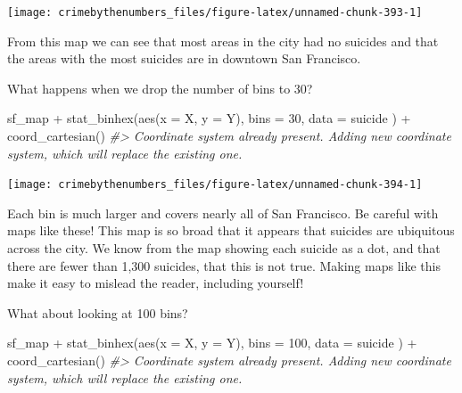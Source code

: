 \documentclass[
]{krantz}
\makeatletter
\newenvironment{Shaded}{\begin{snugshade}}{\end{snugshade}}
\newcommand{\AttributeTok}[1]{\textcolor[rgb]{0.61,0.61,0.61}{#1}}
\newcommand{\CommentTok}[1]{\textcolor[rgb]{0.37,0.37,0.37}{\textit{#1}}}
\newcommand{\DecValTok}[1]{\textcolor[rgb]{0.06,0.06,0.06}{#1}}
\newcommand{\FunctionTok}[1]{\textcolor[rgb]{0,0,0}{#1}}
\newcommand{\NormalTok}[1]{#1}
\newcommand{\SpecialCharTok}[1]{\textcolor[rgb]{0,0,0}{#1}}
\newenvironment{kframe}{%
\medskip{}
\setlength{\fboxsep}{.8em}
 \def\at@end@of@kframe{}%
 \ifinner\ifhmode%
  \def\at@end@of@kframe{\end{minipage}}%
  \begin{minipage}{\columnwidth}%
 \fi\fi%
 \def\FrameCommand##1{\hskip\@totalleftmargin \hskip-\fboxsep
 \colorbox{shadecolor}{##1}\hskip-\fboxsep
     \hskip-\linewidth \hskip-\@totalleftmargin \hskip\columnwidth}%
 \MakeFramed {\advance\hsize-\width
   \@totalleftmargin\z@ \linewidth\hsize
   \@setminipage}}%
 {\par\unskip\endMakeFramed%
 \at@end@of@kframe}
\renewenvironment{Shaded}{\begin{kframe}}{\end{kframe}}
\makeatother
\begin{document}
\begin{center}\texttt{[image: crimebythenumbers\_files/figure-latex/unnamed-chunk-393-1]} \end{center}

From this map we can see that most areas in the city had no
suicides and that the areas with the most suicides are in
downtown San Francisco.

What happens when we drop the number of bins to 30?

\begin{Shaded}
\begin{Highlighting}[]
\NormalTok{sf\_map }\SpecialCharTok{+}
  \FunctionTok{stat\_binhex}\NormalTok{(}\FunctionTok{aes}\NormalTok{(}\AttributeTok{x =}\NormalTok{ X, }\AttributeTok{y =}\NormalTok{ Y),}
    \AttributeTok{bins =} \DecValTok{30}\NormalTok{,}
    \AttributeTok{data =}\NormalTok{ suicide}
\NormalTok{  ) }\SpecialCharTok{+}
  \FunctionTok{coord\_cartesian}\NormalTok{()}
\CommentTok{\#\textgreater{} Coordinate system already present. Adding new coordinate system, which will replace the existing one.}
\end{Highlighting}
\end{Shaded}

\begin{center}\texttt{[image: crimebythenumbers\_files/figure-latex/unnamed-chunk-394-1]} \end{center}

Each bin is much larger and covers nearly all of San
Francisco. Be careful with maps like these! This map is so
broad that it appears that suicides are ubiquitous across
the city. We know from the map showing each suicide as a
dot, and that there are fewer than 1,300 suicides, that this
is not true. Making maps like this make it easy to mislead
the reader, including yourself!

What about looking at 100 bins?

\begin{Shaded}
\begin{Highlighting}[]
\NormalTok{sf\_map }\SpecialCharTok{+}
  \FunctionTok{stat\_binhex}\NormalTok{(}\FunctionTok{aes}\NormalTok{(}\AttributeTok{x =}\NormalTok{ X, }\AttributeTok{y =}\NormalTok{ Y),}
    \AttributeTok{bins =} \DecValTok{100}\NormalTok{,}
    \AttributeTok{data =}\NormalTok{ suicide}
\NormalTok{  ) }\SpecialCharTok{+}
  \FunctionTok{coord\_cartesian}\NormalTok{()}
\CommentTok{\#\textgreater{} Coordinate system already present. Adding new coordinate system, which will replace the existing one.}
\end{Highlighting}
\end{Shaded}
\end{document}
